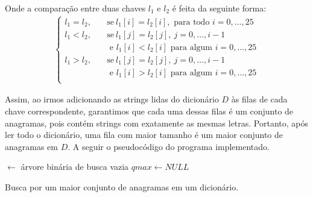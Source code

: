 \documentclass[a4paper]{article}
\begin{document}
    Onde a comparação entre duas chaves $l_1$ e $l_2$ é feita da seguinte forma:
    \begin{align*}
        \begin{cases}
            l_1 = l_2,\quad &\text{se}\ l_1[i] = l_2[i],\text{ para todo } i = 0,\dots, 25\\
            l_1 < l_2,\quad &\text{se}\ l_1[j] = l_2[j],\ j = 0, \dots, i-1\\
                            &\text{ e } l_1[i] < l_2[i] \text{ para algum } i = 0,\dots,25\\
            l_1 > l_2,\quad &\text{se}\ l_1[j] = l_2[j],\ j = 0, \dots, i-1\\
                            &\text{ e } l_1[i] > l_2[i] \text{ para algum } i = 0,\dots,25\\
        \end{cases}
    \end{align*}

    Assim, ao irmos adicionando as strings lidas do dicionário $D$ às filas de cada chave correspondente, garantimos que cada uma dessas filas é um conjunto de anagramas, pois contém strings com exatamente as mesmas letras. Portanto, após ler todo o dicionário, uma fila com maior tamanho é um maior conjunto de anagramas em $D$. A seguir o pseudocódigo do programa implementado.

    \begin{algorithm}[h]
        \BlankLine

        \B $\leftarrow$ árvore binária de busca vazia\;
        $qmax \leftarrow NULL$\;

        \;
        \caption{Busca por um maior conjunto de anagramas em um dicionário.}
    \end{algorithm}
\end{document}
